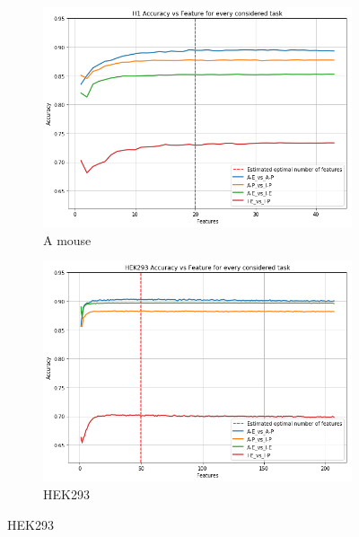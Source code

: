 \begin{figure}[!htb]
\begin{subfigure}[b]{0.48\textwidth}
        \includegraphics[width=\textwidth]{images/features_plots_accuracy/H1_n_features.png}
        \caption{A mouse}
        \label{fig:H1_n_feat}
    \end{subfigure}
    \begin{subfigure}[b]{0.48\textwidth}
        \includegraphics[width=\textwidth]{images/features_plots_accuracy/HEK293_n_features.png}
        \caption{HEK293}
        \label{fig:HEK293_n_feat}
    \end{subfigure}
    

\end{figure}
